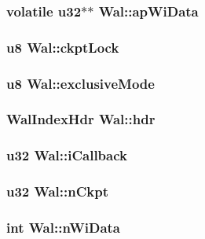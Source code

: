 \subsubsection{\setlength{\rightskip}{0pt plus 5cm}volatile \bf{u32}$\ast$$\ast$ \bf{Wal::ap\-Wi\-Data}}\label{structWal_bfed141d00e489fff9b3d240ef995dba}


\subsubsection{\setlength{\rightskip}{0pt plus 5cm}\bf{u8} \bf{Wal::ckpt\-Lock}}\label{structWal_9eeccf312596ad2a293441041ef4b87b}


\subsubsection{\setlength{\rightskip}{0pt plus 5cm}\bf{u8} \bf{Wal::exclusive\-Mode}}\label{structWal_adfb495b332b29dfec288809c0f12004}


\subsubsection{\setlength{\rightskip}{0pt plus 5cm}\bf{Wal\-Index\-Hdr} \bf{Wal::hdr}}\label{structWal_cdf1fb7f9331266df39d9c9f58e32617}


\subsubsection{\setlength{\rightskip}{0pt plus 5cm}\bf{u32} \bf{Wal::i\-Callback}}\label{structWal_6c7e8e76b9c34ddda3f2ce92616a4b0e}


\subsubsection{\setlength{\rightskip}{0pt plus 5cm}\bf{u32} \bf{Wal::n\-Ckpt}}\label{structWal_698e5ce1459ca9d72b11ce0412f4ef81}


\subsubsection{\setlength{\rightskip}{0pt plus 5cm}int \bf{Wal::n\-Wi\-Data}}\label{structWal_2b1034ea69fd9fc29593a76bc43d2193}


